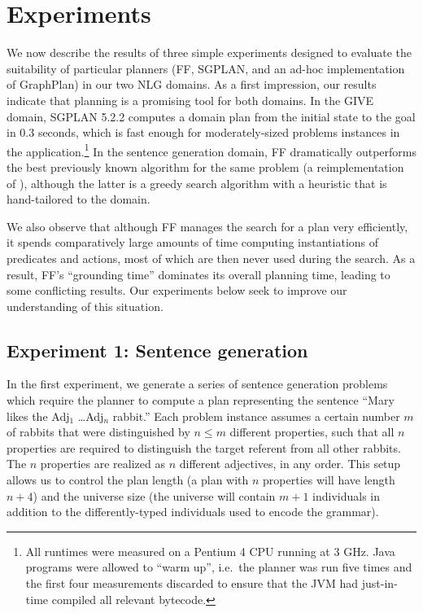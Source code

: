 \section{Experiments} \label{sec:experiments}

We now describe the results of three simple experiments designed to
evaluate the suitability of particular planners (FF, SGPLAN, and an ad-hoc
implementation of GraphPlan) in our two NLG domains. As a first impression,
our results indicate that planning is a promising tool for both domains. In
the GIVE domain, SGPLAN 5.2.2 computes a domain plan from the initial state
to the goal in 0.3 seconds, which is fast enough for moderately-sized
problems instances in the application.\footnote{All runtimes were
  measured on a Pentium 4 CPU running at 3 GHz. Java programs were allowed
  to ``warm up'', i.e.\ the planner was run five times and the first four
  measurements discarded to ensure that the JVM had just-in-time compiled
  all relevant bytecode.}
In the sentence generation domain, FF dramatically outperforms the best
previously known algorithm for the same problem (a reimplementation of
\cite{Stone2003a}), although the latter is a greedy search algorithm with a
heuristic that is hand-tailored to the domain.

We also observe that although FF manages the search for a plan very
efficiently, it spends comparatively large amounts of time computing
instantiations of predicates and actions, most of which are then never used
during the search. As a result, FF's ``grounding time'' dominates its
overall planning time, leading to some conflicting results. Our experiments
below seek to improve our understanding of this situation.


\subsection{Experiment 1: Sentence generation}
\label{sec:exper-1:-sent}

In the first experiment, we generate a series of sentence generation
problems which require the planner to compute a plan representing the
sentence ``Mary likes the Adj$_1$ \ldots Adj$_n$ rabbit.''  Each problem
instance assumes a certain number $m$ of rabbits that were distinguished by
$n \leq m$ different properties, such that all $n$ properties are required
to distinguish the target referent from all other rabbits.  The $n$
properties are realized as $n$ different adjectives, in any order.  This
setup allows us to control the plan length (a plan with $n$ properties will
have length $n+4$) and the universe size (the universe will contain $m+1$
individuals in addition to the differently-typed individuals used to encode
the grammar).

